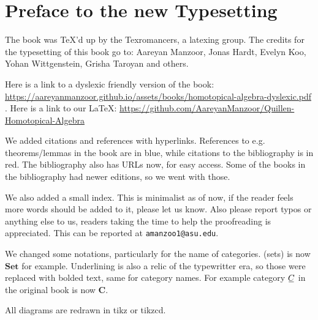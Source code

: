 \documentclass[../main]{subfiles}
\begin{document}
\chapter*{Preface to the new Typesetting}

The book was TeX'd up by the Texromancers, a latexing group. The credits for the typesetting of this book go to:  Aareyan Manzoor, Jonas Hardt, Evelyn Koo, Yohan Wittgenstein, Grisha Taroyan and others.

Here is a link to a dyslexic friendly version of the book:
\url{https://aareyanmanzoor.github.io/assets/books/homotopical-algebra-dyslexic.pdf} . Here is a link to our \LaTeX : \url{https://github.com/AareyanManzoor/Quillen-Homotopical-Algebra}

We added citations and references with hyperlinks. References to e.g. theorems/lemmas in the book are in blue, while citations to the bibliography is
in red. The bibliography also has URLs now, for easy access. Some of the books
in the bibliography had newer editions, so we went with those.

We also added a small index. This is minimalist as of now, if the reader feels more words should be added to it, please let us know. Also please report typos or anything else to us, readers taking the time to help the proofreading is appreciated. This can be reported at \texttt{amanzoo1@asu.edu}.

We changed some notations, particularly for the name of categories. (sets) is now $\mathbf{Set}$ for example. Underlining is also a relic of the typewritter era, so those were replaced with bolded text, same for category names. For example category $\xunderline{C}$ in the original book is now $\mathbf{C}$.

All diagrams are redrawn in tikz or tikzcd.
\end{document}
